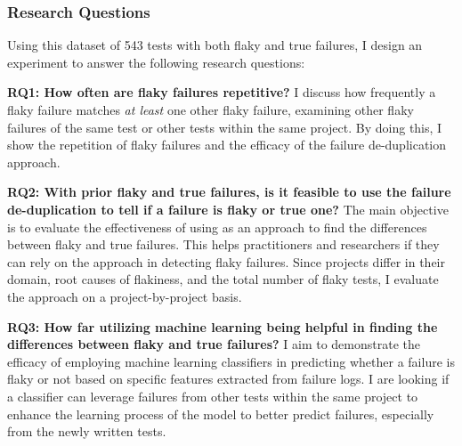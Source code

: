 % 



\subsubsection{Research Questions}

Using this dataset of 543 tests with both flaky and true failures, I design an experiment to answer the following research questions:

\begin{description}
    \item \textbf{RQ1: How often are flaky failures repetitive?} 
    I discuss how frequently a flaky failure matches \emph{at least} one other flaky failure, examining other flaky failures of the same test or other tests within the same project. By doing this, I show the repetition of flaky failures and the efficacy of the failure de-duplication approach. %
    
    \item \textbf{RQ2: With prior flaky and true failures, is it feasible to use the failure de-duplication to tell if a failure is flaky or true one?}
    The main objective is to evaluate the effectiveness of using \syntax as an approach to find the differences between flaky and true failures. This helps practitioners and researchers if they can rely on the approach in detecting flaky failures. Since projects differ in their domain, root causes of flakiness, and the total number of flaky tests, I evaluate the approach on a project-by-project basis.
    
    \item\textbf{RQ3: How far utilizing machine learning being helpful in finding the differences between flaky and true failures?} I aim to demonstrate the efficacy of employing machine learning classifiers in predicting whether a failure is flaky or not based on specific features extracted from failure logs. I are looking if a classifier can leverage failures from other tests within the same project to enhance the learning process of the model to better predict failures, especially from the newly written tests. 
    
\end{description}







